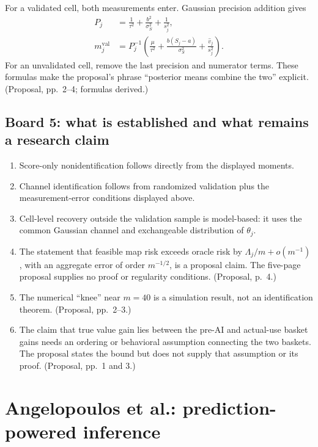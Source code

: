 \documentclass[11pt]{article}
\begin{document}
  For a validated cell, both measurements enter. Gaussian precision addition
  gives
  \begin{align*}
      P_j
      &=
        \frac{1}{\tau^2}
        +\frac{b^2}{\sigma_S^2}
        +\frac{1}{s_j^2}
      ,\\
      m_j^{\mathrm{val}}
      &=
      P_j^{-1}\left(
        \frac{\mu}{\tau^2}
        +\frac{b(S_j-a)}{\sigma_S^2}
        +\frac{\widehat v_j}{s_j^2}
      \right).
  \end{align*}
  For an unvalidated cell, remove the last precision and numerator terms.
  These formulas make the proposal's phrase ``posterior means combine the two''
  explicit. (Proposal, pp.~2--4; formulas derived.)
  
  \subsection*{Board 5: what is established and what remains a research claim}
  
  \begin{enumerate}[leftmargin=2em]
      \item Score-only nonidentification follows directly from the displayed
      moments.
      \item Channel identification follows from randomized validation plus the
      measurement-error conditions displayed above.
      \item Cell-level recovery outside the validation sample is model-based:
      it uses the common Gaussian channel and exchangeable distribution of
      \(\theta_j\).
      \item The statement that feasible map risk exceeds oracle risk by
      \(\Lambda_j/m+o(m^{-1})\), with an aggregate error of order
      \(m^{-1/2}\), is a proposal claim. The five-page proposal supplies no
      proof or regularity conditions. (Proposal, p.~4.)
      \item The numerical ``knee'' near \(m=40\) is a simulation result, not an
      identification theorem. (Proposal, pp.~2--3.)
      \item The claim that true value gain lies between the pre-AI and actual-use
      basket gains needs an ordering or behavioral assumption connecting the two
      baskets. The proposal states the bound but does not supply that assumption
      or its proof. (Proposal, pp.~1 and 3.)
  \end{enumerate}
  
  \section{Angelopoulos et al.: prediction-powered inference}
  
\end{document}
